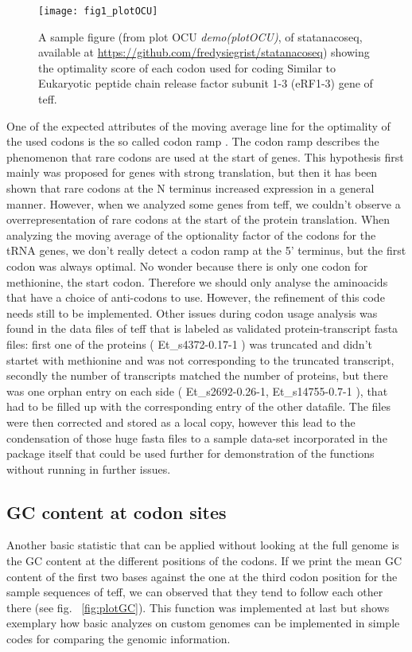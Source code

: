 \begin{figure}[tb] 
\centering 
\texttt{[image: fig1\_plotOCU]} 
\caption[A sample figure from demo plotOCU]{A sample figure (from plot OCU \emph{demo(plotOCU)}, of statanacoseq, available at \url{https://github.com/fredysiegrist/statanacoseq}) showing the optimality score of each codon used for coding Similar to Eukaryotic peptide chain release factor subunit 1-3 (eRF1-3) gene of teff.}
\label{fig:plotOCU} 
\end{figure}

One of the expected attributes of the moving average line for the optimality of the used codons is the so called codon ramp \cite{Tuller2010}. The codon ramp describes the phenomenon that rare codons are used at the start of genes. This hypothesis first mainly was proposed for genes with strong translation, but then it has been shown that rare codons at the N terminus increased expression in a general manner. However, when we analyzed some genes from teff, we couldn't observe a overrepresentation of rare codons at the start of the protein translation.  When analyzing the moving average of the optionality factor of the codons for the tRNA genes, we don't really detect a codon ramp at the 5' terminus, but the first codon was always optimal. No wonder because there is only one codon for methionine, the start codon. Therefore we should only analyse the aminoacids that have a choice of anti-codons to use. However, the refinement of this code needs still to be implemented.  
Other issues during codon usage analysis was found in the data files of teff that is labeled as validated protein-transcript fasta files: 
first one of the proteins (
Et\_s4372-0.17-1
) was truncated and didn't startet with methionine and was not corresponding to the truncated transcript, secondly the number of transcripts matched the number of proteins, but there was one orphan entry on each side (
Et\_s2692-0.26-1, Et\_s14755-0.7-1
), that had to be filled up with the corresponding entry of the other datafile. 
The files were then corrected and stored as a local copy, however this lead to the condensation of those huge fasta files to a sample data-set incorporated in the package itself that could be used further for demonstration of the functions without running in further issues.

\subsection{GC content at codon sites}
Another basic statistic that can be applied without looking at the full genome is the GC content at the different positions of the codons. If we print the mean GC content of the first two bases against the one at the third codon position for the sample sequences of teff, we can observed that they tend to follow each other there (see fig. ~\ref{fig:plotGC}). This function was implemented at last but shows exemplary how basic analyzes on custom genomes can be implemented in simple codes for comparing the genomic information.

